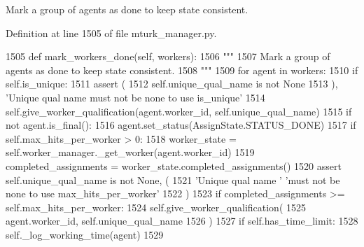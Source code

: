 \begin{DoxyVerb}Mark a group of agents as done to keep state consistent.
\end{DoxyVerb}
 

Definition at line 1505 of file mturk\+\_\+manager.\+py.


\begin{DoxyCode}
1505     \textcolor{keyword}{def }mark\_workers\_done(self, workers):
1506         \textcolor{stringliteral}{"""}
1507 \textcolor{stringliteral}{        Mark a group of agents as done to keep state consistent.}
1508 \textcolor{stringliteral}{        """}
1509         \textcolor{keywordflow}{for} agent \textcolor{keywordflow}{in} workers:
1510             \textcolor{keywordflow}{if} self.is\_unique:
1511                 \textcolor{keyword}{assert} (
1512                     self.unique\_qual\_name \textcolor{keywordflow}{is} \textcolor{keywordflow}{not} \textcolor{keywordtype}{None}
1513                 ), \textcolor{stringliteral}{'Unique qual name must not be none to use is\_unique'}
1514                 self.give\_worker\_qualification(agent.worker\_id, self.unique\_qual\_name)
1515             \textcolor{keywordflow}{if} \textcolor{keywordflow}{not} agent.is\_final():
1516                 agent.set\_status(AssignState.STATUS\_DONE)
1517             \textcolor{keywordflow}{if} self.max\_hits\_per\_worker > 0:
1518                 worker\_state = self.worker\_manager.\_get\_worker(agent.worker\_id)
1519                 completed\_assignments = worker\_state.completed\_assignments()
1520                 \textcolor{keyword}{assert} self.unique\_qual\_name \textcolor{keywordflow}{is} \textcolor{keywordflow}{not} \textcolor{keywordtype}{None}, (
1521                     \textcolor{stringliteral}{'Unique qual name '} \textcolor{stringliteral}{'must not be none to use max\_hits\_per\_worker'}
1522                 )
1523                 \textcolor{keywordflow}{if} completed\_assignments >= self.max\_hits\_per\_worker:
1524                     self.give\_worker\_qualification(
1525                         agent.worker\_id, self.unique\_qual\_name
1526                     )
1527             \textcolor{keywordflow}{if} self.has\_time\_limit:
1528                 self.\_log\_working\_time(agent)
1529 
\end{DoxyCode}
\mbox{\label{classparlai_1_1mturk_1_1core_1_1mturk__manager_1_1MTurkManager_ad4ee676f38d610a5eb43aadf105237f4}} 

